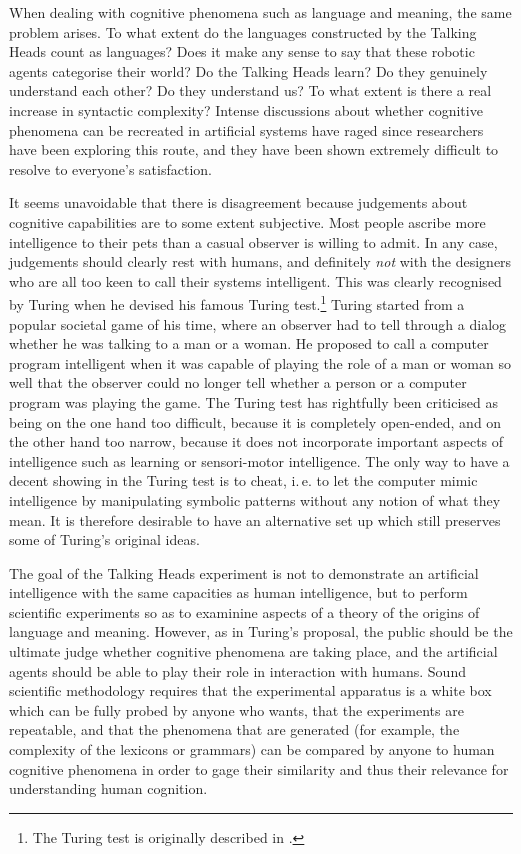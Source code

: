 When dealing with cognitive phenomena such as language
and meaning, the same problem arises. To what extent
do the languages constructed by the Talking Heads count
as languages? Does it make any sense to say that these robotic 
agents categorise their world? Do the Talking
Heads learn? Do they genuinely understand each other? Do they 
understand us? To what extent 
is there a real increase in syntactic 
complexity? Intense discussions about whether cognitive phenomena can 
be recreated in artificial systems 
have raged since researchers have been exploring this 
route, and they have been shown extremely difficult to resolve to 
everyone's satisfaction. 

It seems unavoidable that there is disagreement because 
judgements about cognitive capabilities are to some 
extent subjective. Most people ascribe more intelligence
to their pets than a casual observer is willing to admit. 
In any case, judgements should clearly rest with humans, and
definitely {\itshape not} with the designers 
who are all too keen to call their systems intelligent. 
This was clearly recognised by Turing  when he devised
his famous Turing test.\footnote{The Turing test is originally described in 
\cite{Turing:1950}.} Turing started from a popular societal 
game of his time, where an observer had to tell through
a dialog whether he was talking to a man or a woman. 
He proposed to call a computer program intelligent when 
it was capable of playing the role of a man or woman
so well that the observer could no longer tell whether
a person or a computer program was playing the game. 
The Turing test has rightfully been criticised as being
on the one hand too difficult, because it is completely 
open-ended, and on the other hand too narrow, because it 
does not incorporate important aspects of intelligence such 
as learning or sensori-motor intelligence. The only way 
to have a decent showing in the Turing test is to
cheat, i.\,e. to let the computer mimic intelligence 
by manipulating symbolic patterns without any notion of what 
they mean. It is therefore desirable to have an alternative
set up which still preserves some of Turing's original 
ideas. 

The goal of the Talking Heads experiment is not to demonstrate 
an artificial intelligence with the same capacities as 
human intelligence, but to perform
scientific experiments so as to examinine aspects 
of a theory of the origins of language and meaning. 
However, as in Turing's proposal, the public should be 
the ultimate judge whether cognitive phenomena are taking
place, and the artificial agents should be able to play their role
in interaction with humans. 
Sound scientific methodology requires that 
the experimental apparatus is a white box which can be fully probed 
by anyone who wants, that the experiments are repeatable, 
and that the phenomena that are generated 
(for example, the complexity of the lexicons or 
grammars) can be 
compared by anyone to human cognitive phenomena in order to gage 
their similarity and thus their relevance for understanding
human cognition. 

